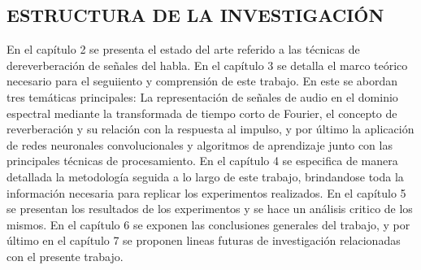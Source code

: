 \subsection[Estructura de la Investigación]{ESTRUCTURA DE LA INVESTIGACIÓN}
En el capítulo 2 se presenta el estado del arte referido a las técnicas de dereverberación de señales del habla. 
En el capítulo 3 se detalla el marco teórico necesario para el seguiiento y comprensión de este trabajo. En este se abordan tres temáticas principales: La representación de señales de audio en el dominio espectral mediante la transformada de tiempo corto de Fourier, el concepto de reverberación y su relación con la respuesta al impulso, y por último la aplicación de redes neuronales convolucionales y algoritmos de aprendizaje junto con las principales técnicas de procesamiento.  
En el capítulo 4 se especifica de manera detallada la metodología seguida a lo largo de este trabajo, brindandose toda la información necesaria para replicar los experimentos realizados. 
En el capítulo 5 se presentan los resultados de los experimentos y se hace un análisis critico de los mismos. 
En el capítulo 6 se exponen las conclusiones generales del trabajo, y por último en el capítulo 7 se proponen lineas futuras de investigación relacionadas con el presente trabajo. 